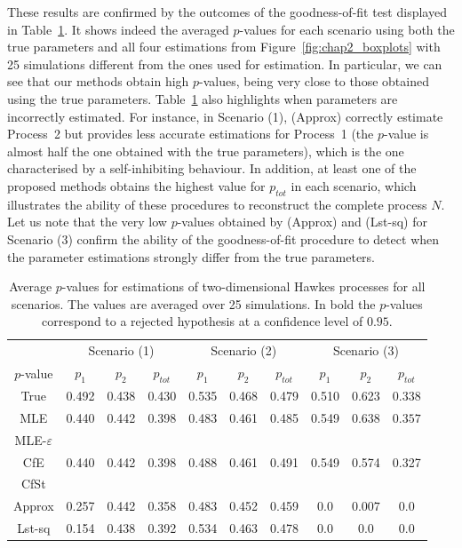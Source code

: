     These results are confirmed by the outcomes of the goodness-of-fit test displayed in Table~\ref{tab:chap2_p_values_2}.
    It shows indeed the averaged $p$-values for each scenario using both the true parameters and all four estimations from Figure~\ref{fig:chap2_boxplots} with 25 simulations different from the ones used for estimation. In particular, we can see that our methods obtain high $p$-values, being very close to those obtained using the true parameters.
    Table~\ref{tab:chap2_p_values_2} also highlights when parameters are incorrectly estimated.
    For instance, in Scenario (1), (Approx) correctly estimate Process~2 but provides less accurate estimations for Process~1 (the \(p\)-value is almost half the one obtained with the true parameters), which is the one characterised by a self-inhibiting behaviour.
    In addition, at least one of the proposed methods obtains the highest value for $p_{tot}$ in each scenario, which illustrates the ability of these procedures to reconstruct the complete process $N$.
    Let us note that the very low \(p\)-values obtained by (Approx) and (Lst-sq) for Scenario (3) confirm the ability of the goodness-of-fit procedure to detect when the parameter estimations strongly differ from the true parameters.
    
    \begin{table}[!ht]
    \begin{center}
    \centering
    \begin{tabular}{c|ccc|ccc|ccc}
          & \multicolumn{3}{c|}{Scenario (1)}& \multicolumn{3}{c|}{Scenario (2)}& \multicolumn{3}{c}{Scenario (3)} \\
         $p$-value & $p_1$ & $p_2$ & $p_{tot}$ & $p_1$ & $p_2$ & $p_{tot}$ & $p_1$ & $p_2$ & $p_{tot}$\\
         \toprule
         True & 0.492 & 0.438 & 0.430 & 0.535 & 0.468 & 0.479 & 0.510 & 0.623 & 0.338\\
         \midrule
         MLE &  0.440 & 0.442  & 0.398  & 0.483  & 0.461  & 0.485 & 0.549  & 0.638 & $0.357$\\
         \midrule
         MLE-$\varepsilon$ & \multirow{3}{*}{0.440} & \multirow{3}{*}{0.442} &  \multirow{3}{*}{0.398} & \multirow{3}{*}{0.488}  & \multirow{3}{*}{0.461} & \multirow{3}{*}{0.491} & \multirow{3}{*}{0.549} & \multirow{3}{*}{0.574}  & \multirow{3}{*}{0.327}  \\
         CfE &  &  &  &  &  &  &  &  &  \\
         CfSt &  &  &  &  &  &  &  &  &  \\
         \midrule
         Approx & 0.257 & 0.442 & 0.358 & 0.483 & 0.452 & 0.459 & $\mathbf{0.0}$ & $\mathbf{0.007}$ & $\mathbf{0.0}$ \\
         Lst-sq & 0.154 & 0.438 & 0.392 & 0.534 & 0.463 & 0.478 & $\mathbf{0.0}$ & $\mathbf{0.0}$ & $\mathbf{0.0}$
    \end{tabular}
    \caption{Average $p$-values for estimations of two-dimensional Hawkes processes for all scenarios. The values are averaged over 25 simulations. In bold the $p$-values correspond to a rejected hypothesis at a confidence level of $0.95$.}
    \label{tab:chap2_p_values_2}
    \end{center}
    \end{table}

